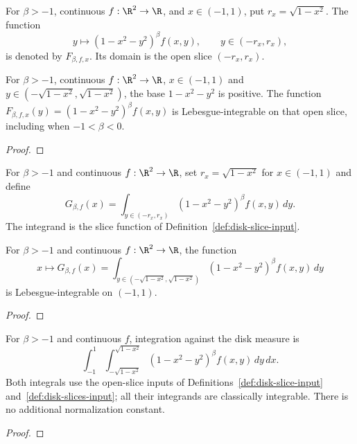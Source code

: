 \begin{supporting}
\begin{definition}
\label{def:disk-slice-input}
\leanok
For $\beta>-1$, continuous $f:\R^2\to\R$, and $x\in(-1,1)$, put
$r_x=\sqrt{1-x^2}$. The function
\[
 y\longmapsto (1-x^2-y^2)^\beta f(x,y),\qquad y\in(-r_x,r_x),
\]
is denoted by $F_{\beta,f,x}$. Its domain is the open slice $(-r_x,r_x)$.
\end{definition}
\begin{theorem}
\label{thm:disk-slice-input}
\leanok
For $\beta>-1$, continuous $f:\R^2\to\R$, $x\in(-1,1)$ and
$y\in(-\sqrt{1-x^2},\sqrt{1-x^2})$, the base $1-x^2-y^2$ is positive.
The function $F_{\beta,f,x}(y)=(1-x^2-y^2)^\beta f(x,y)$ is Lebesgue-integrable
on that open slice, including when $-1<\beta<0$.
\end{theorem}
\begin{proof}
\leanok
\end{proof}

\begin{definition}
\label{def:disk-slices-input}
\leanok
For $\beta>-1$ and continuous $f:\R^2\to\R$, set $r_x=\sqrt{1-x^2}$
for $x\in(-1,1)$ and define
\[
 G_{\beta,f}(x)=\int_{y\in(-r_x,r_x)}(1-x^2-y^2)^\beta f(x,y)\,dy.
\]
The integrand is the slice function of Definition~\ref{def:disk-slice-input}.
\end{definition}
\begin{theorem}
\label{thm:disk-slices-input}
\leanok
For $\beta>-1$ and continuous $f:\R^2\to\R$, the function
\[
 x\longmapsto G_{\beta,f}(x)
 =\int_{y\in(-\sqrt{1-x^2},\sqrt{1-x^2})}(1-x^2-y^2)^\beta f(x,y)\,dy
\]
is Lebesgue-integrable on $(-1,1)$.
\end{theorem}
\begin{proof}
\leanok
\end{proof}

\begin{theorem}
\label{thm:disk-density}
\leanok
For $\beta>-1$ and continuous $f$, integration against the disk measure is
\[
\int_{-1}^1\int_{-\sqrt{1-x^2}}^{\sqrt{1-x^2}}
 (1-x^2-y^2)^\beta f(x,y)\,dy\,dx.
\]
Both integrals use the open-slice inputs of Definitions~\ref{def:disk-slice-input} and~\ref{def:disk-slices-input}; all their integrands are classically integrable.
There is no additional normalization constant.
\end{theorem}
\begin{proof}
\leanok
\end{proof}


\end{supporting}
